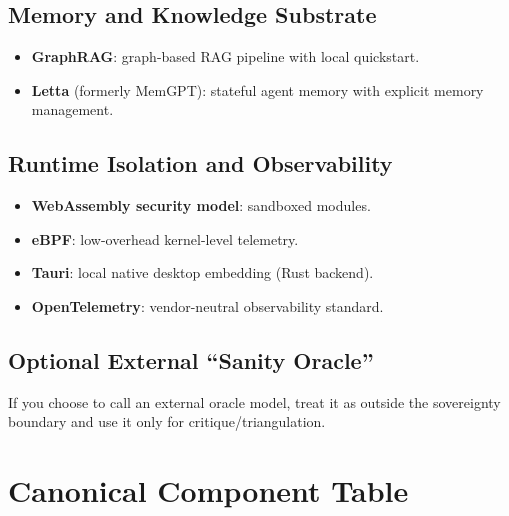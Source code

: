 \documentclass[11pt]{article}
\begin{document}
\subsection{Memory and Knowledge Substrate}

\begin{itemize}
  \item \textbf{GraphRAG}: graph-based RAG pipeline with local quickstart.
  \item \textbf{Letta} (formerly MemGPT): stateful agent memory with explicit memory management.
\end{itemize}

\subsection{Runtime Isolation and Observability}

\begin{itemize}
  \item \textbf{WebAssembly security model}: sandboxed modules.
  \item \textbf{eBPF}: low-overhead kernel-level telemetry.
  \item \textbf{Tauri}: local native desktop embedding (Rust backend).
  \item \textbf{OpenTelemetry}: vendor-neutral observability standard.
\end{itemize}

\subsection{Optional External ``Sanity Oracle''}

If you choose to call an external oracle model, treat it as outside the sovereignty boundary and use it only for critique/triangulation.

\section{Canonical Component Table}
\end{document}
